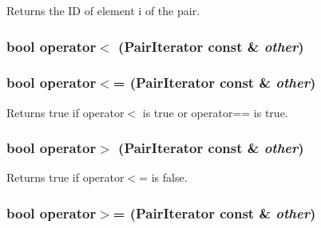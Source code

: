 Returns the ID of element i of the pair. \hypertarget{classJKBuilder_1_1PairIterator_a1984297ca1081efc0513ec2f5e6a6177}{
\subsubsection[{operator$<$}]{\setlength{\rightskip}{0pt plus 5cm}bool operator$<$ ({\bf PairIterator} const \& {\em other})}}
\label{classJKBuilder_1_1PairIterator_a1984297ca1081efc0513ec2f5e6a6177}
\hypertarget{classJKBuilder_1_1PairIterator_a9c95b8dd7929cb34336a944ce96e88a7}{
\subsubsection[{operator$<$=}]{\setlength{\rightskip}{0pt plus 5cm}bool operator$<$= ({\bf PairIterator} const \& {\em other})}}
\label{classJKBuilder_1_1PairIterator_a9c95b8dd7929cb34336a944ce96e88a7}


Returns true if operator$<$ is true or operator== is true. \hypertarget{classJKBuilder_1_1PairIterator_ab37a738406950a5e19931f4c09b41f29}{
\subsubsection[{operator$>$}]{\setlength{\rightskip}{0pt plus 5cm}bool operator$>$ ({\bf PairIterator} const \& {\em other})}}
\label{classJKBuilder_1_1PairIterator_ab37a738406950a5e19931f4c09b41f29}


Returns true if operator$<$= is false. \hypertarget{classJKBuilder_1_1PairIterator_a0064337d38b8f97d0367be2e9bd31d62}{
\subsubsection[{operator$>$=}]{\setlength{\rightskip}{0pt plus 5cm}bool operator$>$= ({\bf PairIterator} const \& {\em other})}}
\label{classJKBuilder_1_1PairIterator_a0064337d38b8f97d0367be2e9bd31d62}


